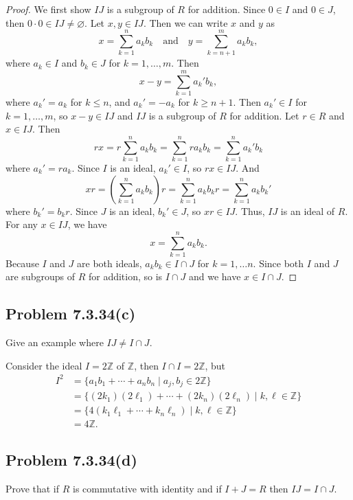 \documentclass[12pt]{article}
\newenvironment{problem}
    {\begin{lrbox}{\mybox}\begin{minipage}{0.98\textwidth}}
    {\end{minipage}\end{lrbox}\begin{center}\framebox[\textwidth]{\usebox{\mybox}}\end{center}}
\theoremstyle{definition}
\newcommand{\isp}[1]{\quad\text{#1}\quad}
\newcommand{\Z}{\mathbb{Z}}
\renewcommand{\emptyset}{\varnothing}
\begin{document}
\begin{proof}
    We first show $IJ$ is a subgroup of $R$ for addition. Since $0 \in I$ and $0 \in J$, then $0 \cdot 0 \in IJ \ne \emptyset$. Let $x, y \in IJ$. Then we can write $x$ and $y$ as
    \[
        x = \sum_{k=1}^n a_k b_k \isp{and} y = \sum_{k=n+1}^m a_k b_k,
    \]
    where $a_k \in I$ and $b_k \in J$ for $k = 1, \dots, m$. Then
    \[
        x - y = \sum_{k=1}^m a_k' b_k,
    \]
    where $a_k' = a_k$ for $k \leq n$, and $a_k' = -a_k$ for $k \geq n+1$. Then $a_k' \in I$ for $k = 1, \dots, m$, so $x - y \in IJ$ and $IJ$ is a subgroup of $R$ for addition. Let $r \in R$ and $x \in IJ$. Then
    \[
        rx = r\sum_{k=1}^n a_k b_k = \sum_{k=1}^n ra_k b_k = \sum_{k=1}^n a_k' b_k
    \]
    where $a_k' = ra_k$. Since $I$ is an ideal, $a_k' \in I$, so $rx \in IJ$. And
    \[
        xr = \left(\sum_{k=1}^n a_k b_k\right)r = \sum_{k=1}^n a_k b_kr = \sum_{k=1}^n a_k b_k'
    \]
    where $b_k' = b_kr$. Since $J$ is an ideal, $b_k' \in J$, so $xr \in IJ$. Thus, $IJ$ is an ideal of $R$. For any $x \in IJ$, we have
    \[
        x = \sum_{k=1}^n a_k b_k.
    \]
    Because $I$ and $J$ are both ideals,  $a_kb_k \in I \cap J$ for $k = 1, \dots n$. Since both $I$ and $J$ are subgroups of $R$ for addition, so is $I \cap J$ and we have $x \in I \cap J$.
    
\end{proof}

\subsection{Problem 7.3.34(c)}
\begin{problem}
    Give an example where $IJ \ne I \cap J$.
\end{problem}

Consider the ideal $I = 2\Z$ of $\Z$, then $I \cap I = 2\Z$, but
\begin{align*}
    I^2 
        &= \{a_1b_1 + \cdots + a_nb_n \mid a_j, b_j \in 2\Z\} \\
        &= \{(2k_1)(2\ell_1) + \cdots + (2k_n)(2\ell_n) \mid k, \ell \in \Z\} \\
        &= \{4(k_1\ell_1 + \cdots + k_n\ell_n) \mid k, \ell \in \Z\} \\
        &= 4\Z.
\end{align*}


\subsection{Problem 7.3.34(d)}
\begin{problem}
    Prove that if $R$ is commutative with identity and if $I + J = R$ then $IJ = I \cap J$.
\end{problem}
\end{document}
